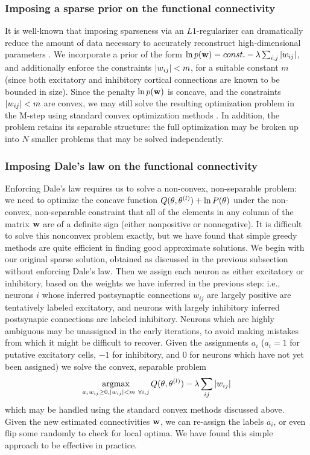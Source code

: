 \subsubsection{Imposing a sparse prior on the functional connectivity}

It is well-known that imposing sparseness via an $L1$-regularizer can
dramatically reduce the amount of data necessary to accurately
reconstruct high-dimensional parameters
\cite{Tibs96,TIP01,DE03,NG04,Candes2005,Mishchenko2009}.  We
incorporate a prior of the form $\ln p(\mathbf{w}) = const. - \lambda
\sum_{i,j} |w_{ij}|$, and additionally enforce the constraints
$|w_{ij}|<m$, for a suitable constant $m$ (since both excitatory and
inhibitory cortical connections are known to be bounded in size).
Since the penalty $\ln p(\mathbf{w})$ is concave, and the constraints
$|w_{ij}|<m$ are convex, we may still solve the resulting
optimization problem in the M-step using standard convex optimization
methods \cite{CONV04}.  In addition, the problem retains its separable
structure: the full optimization may be broken up into $N$ smaller
problems that may be solved independently.

\subsubsection{Imposing Dale's law on the functional connectivity}

Enforcing Dale's law requires us to solve a non-convex, non-separable
problem: we need to optimize the concave function $Q(\mathbf{\theta},\mathbf{\theta}^{(l)})
+ \ln P(\theta)$ under the non-convex, non-separable constraint that
all of the elements in any column of the matrix $\mathbf{w}$ are of a
definite sign (either nonpositive or nonnegative). It is difficult to
solve this nonconvex problem exactly, but we have found that simple
greedy methods are quite efficient in finding good approximate
solutions. We begin with our original sparse solution, obtained as
discussed in the previous subsection without enforcing Dale's
law. Then we assign each neuron as either excitatory or inhibitory,
based on the weights we have inferred in the previous step: i.e.,
neurons $i$ whose inferred postsynaptic connections $w_{ij}$ are
largely positive are tentatively labeled excitatory, and neurons with
largely inhibitory inferred postsynapic connections are labeled
inhibitory. Neurons which are highly ambiguous may be unassigned in
the early iterations, to avoid making mistakes from which it might be
difficult to recover. Given the assignments $a_i$ ($a_i =1$ for
putative excitatory cells, $-1$ for inhibitory, and $0$ for neurons
which have not yet been assigned) we solve the convex, separable
problem
\begin{equation}
\argmax_{\substack{a_i \w_{ij} \geq 0, |w_{ij}|<m ~ \forall i,j}}
Q(\bth,\bth^{(l)}) - \lambda \sum_{ij} |w_{ij}|
\end{equation}
which may be handled using the standard convex methods discussed
above.  Given the new estimated connectivities $\mathbf{w}$, we can re-assign
the labels $a_i$, or even flip some randomly to check for local
optima.  We have found this simple approach to be effective in
practice.



